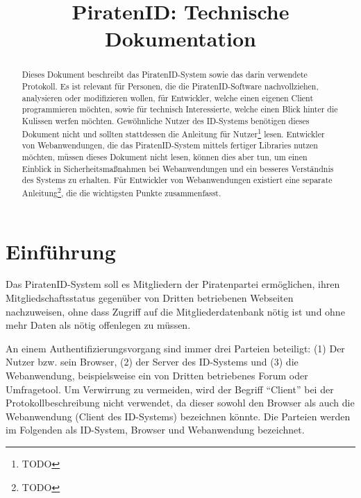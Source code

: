 

\title{PiratenID: Technische Dokumentation}


\maketitle

\begin{abstract}Dieses Dokument beschreibt das PiratenID-System sowie das darin verwendete Protokoll.
Es ist relevant für Personen, die die PiratenID-Software nachvollziehen, analysieren oder modifizieren wollen,
für Entwickler, welche einen eigenen Client programmieren möchten, sowie für technisch Interessierte, welche einen Blick hinter die Kulissen werfen möchten.
Gewöhnliche Nutzer des ID-Systems benötigen dieses Dokument nicht und sollten stattdessen die Anleitung für Nutzer\footnote{TODO} lesen.
Entwickler von Webanwendungen, die das PiratenID-System mittels fertiger Libraries nutzen möchten, müssen dieses Dokument nicht lesen,
können dies aber tun, um einen Einblick in Sicherheitsmaßnahmen bei Webanwendungen und ein besseres Verständnis des Systems zu erhalten.
Für Entwickler von Webanwendungen existiert eine separate Anleitung\footnote{TODO}, die die wichtigsten Punkte zusammenfasst.
\end{abstract}

\newpage

\tableofcontents

\newpage

\section{Einführung}
Das PiratenID-System soll es Mitgliedern der Piratenpartei ermöglichen, ihren Mitgliedschaftsstatus gegenüber von Dritten betriebenen Webseiten nachzuweisen,
ohne dass Zugriff auf die Mitgliederdatenbank nötig ist und ohne mehr Daten als nötig offenlegen zu müssen.

An einem Authentifizierungsvorgang sind immer drei Parteien beteiligt: (1) Der Nutzer bzw. sein Browser, (2) der Server des ID-Systems und (3) die Webanwendung,
beispielsweise ein von Dritten betriebenes Forum oder Umfragetool.
Um Verwirrung zu vermeiden, wird der Begriff "`Client"' bei der Protokollbeschreibung nicht verwendet,
da dieser sowohl den Browser als auch die Webanwendung (Client des ID-Systems) bezeichnen könnte.
Die Parteien werden im Folgenden als ID-System, Browser und Webanwendung bezeichnet.

